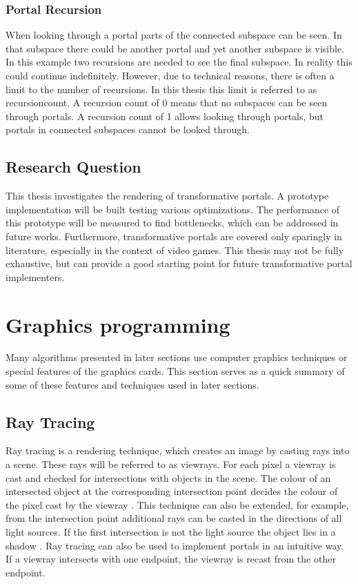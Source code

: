 \subsection{Portal Recursion}
When looking through a portal parts of the connected subspace can be seen. In that subspace there could be another portal and yet another subspace is visible. In this example two recursions are needed to see the final subspace. In reality this could continue indefinitely. However, due to technical reasons, there is often a limit to the number of recursions. In this thesis this limit is referred to as \gls{recursioncount}. A recursion count of 0 means that no subspaces can be seen through portals. A recursion count of 1 allows looking through portals, but portals in connected subspaces cannot be looked through.

\section{Research Question}


This thesis investigates the rendering of transformative portals. A prototype implementation will be built testing various optimizations. The performance of this prototype will be measured to find bottlenecks, which can be addressed in future works. Furthermore, transformative portals are covered only sparingly in literature, especially in the context of video games. This thesis may not be fully exhaustive, but can provide a good starting point for future transformative portal implementers.


\chapter{Graphics programming}

Many algorithms presented in later sections use computer graphics techniques or special features of the graphics cards. This section serves as a quick summary of some of these features and techniques used in later sections. 


\section{Ray Tracing}
Ray tracing is a rendering technique, which creates an image by casting rays into a scene. These rays will be referred to as \glspl{viewray}. For each pixel a \gls{viewray} is cast and checked for intersections with objects in the scene. The colour of an intersected object at the corresponding intersection point decides the colour of the pixel cast by the \gls{viewray} \cite{bungartz:2002:einfuhrung}. This technique can also be extended, for example, from the intersection point additional rays can be casted in the directions of all light sources. If the first intersection is not the light source the object lies in a shadow \cite{whitted:2005:improved}. Ray tracing can also be used to implement portals in an intuitive way. If a \gls{viewray} intersects with one \gls{endpoint}, the \gls{viewray} is recast from the other \gls{endpoint}.

